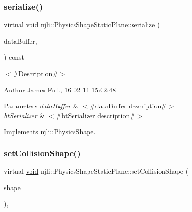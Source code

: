 \subsubsection{\texorpdfstring{serialize()}{serialize()}}
{\footnotesize\ttfamily virtual \mbox{\hyperlink{_thread_8h_af1e856da2e658414cb2456cb6f7ebc66}{void}} njli\+::\+Physics\+Shape\+Static\+Plane\+::serialize (\begin{DoxyParamCaption}\item[{\mbox{\hyperlink{_thread_8h_af1e856da2e658414cb2456cb6f7ebc66}{void}} $\ast$}]{data\+Buffer,  }\item[{bt\+Serializer $\ast$}]{ }\end{DoxyParamCaption}) const\hspace{0.3cm}{\ttfamily [virtual]}}



$<$\#\+Description\#$>$ 

\begin{DoxyAuthor}{Author}
James Folk, 16-\/02-\/11 15\+:02\+:48
\end{DoxyAuthor}

\begin{DoxyParams}{Parameters}
{\em data\+Buffer} & $<$\#data\+Buffer description\#$>$ \\
\hline
{\em bt\+Serializer} & $<$\#bt\+Serializer description\#$>$ \\
\hline
\end{DoxyParams}


Implements \mbox{\hyperlink{classnjli_1_1_physics_shape_a2ac8a109a5ad67ee79f40ce8f28337cf}{njli\+::\+Physics\+Shape}}.

\mbox{\label{classnjli_1_1_physics_shape_static_plane_a5ebd80dd3f719bc9f172f29e3bdf290d}} 
\subsubsection{\texorpdfstring{set\+Collision\+Shape()}{setCollisionShape()}}
{\footnotesize\ttfamily virtual \mbox{\hyperlink{_thread_8h_af1e856da2e658414cb2456cb6f7ebc66}{void}} njli\+::\+Physics\+Shape\+Static\+Plane\+::set\+Collision\+Shape (\begin{DoxyParamCaption}\item[{const bt\+Collision\+Shape \&}]{shape }\end{DoxyParamCaption})\hspace{0.3cm}{\ttfamily [protected]}, {\ttfamily [virtual]}}



